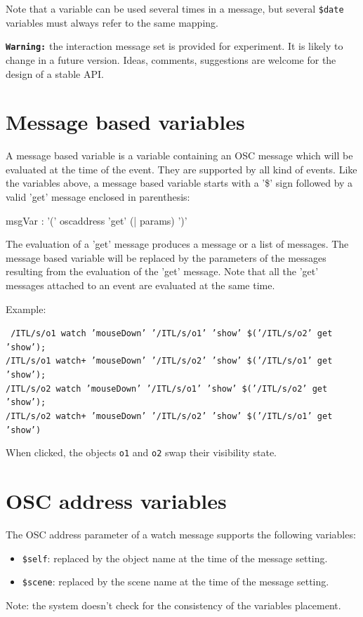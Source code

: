 \documentclass[a4paper,twoside]{report}
\newcommand{\sublevel}[1]	{\section{#1}}
\newcommand{\OSC}[1]		{\texttt{#1}}
\newcommand{\sample}	[1]			{\begin{center}\colorbox{mygrey}{
								\begin{minipage}[t]{0.9\columnwidth} 
								{\small \texttt{#1}}
								\end{minipage}}\end{center}}
\begin{document}
Note that a variable can be used several times in a message, but several \OSC{\$date} variables must always refer to the same mapping.

\vspace{5mm}
\texttt{\textbf{Warning:}} the interaction message set is provided for experiment. It is likely to change in a future version. Ideas, comments, suggestions are welcome for the design of a stable API.

\sublevel{Message based variables}
\label{msgvar}

A message based variable is a variable containing an OSC message which will be evaluated at the time of the event. They are supported by all kind of events. Like  the variables above, a message based variable starts with a '\$' sign followed by a valid 'get' message enclosed in parenthesis:
\begin{rail} 
msgVar : '(' oscaddress 'get' (| params) ')'
\end{rail}

The evaluation of a 'get' message produces a message or a list of messages. The message based variable will be replaced by the parameters of the messages resulting from the evaluation of the 'get' message.
Note that all the 'get' messages attached to an event are evaluated at the same time.

Example:
\sample{ 
/ITL/s/o1 watch  'mouseDown' '/ITL/s/o1' 'show' \$('/ITL/s/o2' get 'show'); \\
/ITL/s/o1 watch+ 'mouseDown' '/ITL/s/o2' 'show' \$('/ITL/s/o1' get 'show'); \\
/ITL/s/o2 watch  'mouseDown' '/ITL/s/o1' 'show' \$('/ITL/s/o2' get 'show'); \\
/ITL/s/o2 watch+ 'mouseDown' '/ITL/s/o2' 'show' \$('/ITL/s/o1' get 'show')
}
When clicked, the objects \OSC{o1} and \OSC{o2} swap their visibility state.



\sublevel{OSC address variables}
\label{oscvar}
The OSC address parameter of a watch message supports the following variables:
\begin{itemize}
\item \OSC{\$self}: replaced by the object name at the time of the message setting.
\item \OSC{\$scene}: replaced by the scene name at the time of the message setting.
\end{itemize}
Note: the system doesn't check for the consistency of the variables placement.
\end{document}
